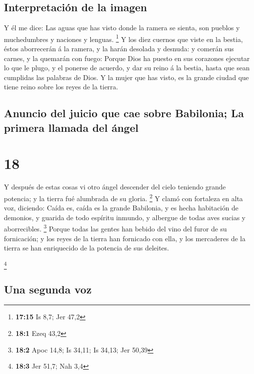 \hypertarget{interpretaciuxf3n-de-la-imagen}{%
\subsection{Interpretación de la
imagen}\label{interpretaciuxf3n-de-la-imagen}}

 Y él me dice: Las aguas que has visto donde la ramera se
sienta, son pueblos y muchedumbres y naciones y lenguas. \footnote{\textbf{17:15}
  Is 8,7; Jer 47,2}  Y los diez cuernos que viste en la
bestia, éstos aborrecerán á la ramera, y la harán desolada y desnuda: y
comerán sus carnes, y la quemarán con fuego:  Porque Dios
ha puesto en sus corazones ejecutar lo que le plugo, y el ponerse de
acuerdo, y dar su reino á la bestia, hasta que sean cumplidas las
palabras de Dios.  Y la mujer que has visto, es la grande
ciudad que tiene reino sobre los reyes de la tierra.

\hypertarget{anuncio-del-juicio-que-cae-sobre-babilonia-la-primera-llamada-del-uxe1ngel}{%
\subsection{Anuncio del juicio que cae sobre Babilonia; La primera
llamada del
ángel}\label{anuncio-del-juicio-que-cae-sobre-babilonia-la-primera-llamada-del-uxe1ngel}}

\hypertarget{section-17}{%
\section{18}\label{section-17}}

 Y después de estas cosas vi otro ángel descender del cielo
teniendo grande potencia; y la tierra fué alumbrada de su gloria.
\footnote{\textbf{18:1} Ezeq 43,2}  Y clamó con fortaleza en
alta voz, diciendo: Caída es, caída es la grande Babilonia, y es hecha
habitación de demonios, y guarida de todo espíritu inmundo, y albergue
de todas aves sucias y aborrecibles. \footnote{\textbf{18:2} Apoc 14,8;
  Is 34,11; Is 34,13; Jer 50,39}  Porque todas las gentes
han bebido del vino del furor de su fornicación; y los reyes de la
tierra han fornicado con ella, y los mercaderes de la tierra se han
enriquecido de la potencia de sus deleites.

\footnote{\textbf{18:3} Jer 51,7; Nah 3,4}

\hypertarget{una-segunda-voz}{%
\subsection{Una segunda voz}\label{una-segunda-voz}}

